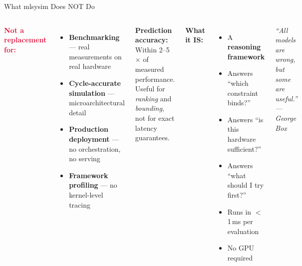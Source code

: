 \begin{frame}{What mlsysim Does NOT Do}
\begin{columns}[T]
\textbf{\textcolor{crimson}{Not a replacement for:}}
\begin{itemize}
  \item \textbf{Benchmarking} --- real measurements on real hardware
  \item \textbf{Cycle-accurate simulation} --- microarchitectural detail
  \item \textbf{Production deployment} --- no orchestration, no serving
  \item \textbf{Framework profiling} --- no kernel-level tracing
\end{itemize}

\vspace{0.5em}
\textbf{Prediction accuracy:}\\
Within \alert{2--5$\times$} of measured performance.\\
Useful for \emph{ranking} and \emph{bounding},\\
not for exact latency guarantees.

\textbf{\textcolor{datastroke}{What it IS:}}
\begin{itemize}
  \item A \textbf{reasoning framework}
  \item Answers ``which constraint binds?''
  \item Answers ``is this hardware sufficient?''
  \item Answers ``what should I try first?''
  \item Runs in $<$1\,ms per evaluation
  \item No GPU required
\end{itemize}

\vspace{0.5em}
\begin{center}
\small\itshape
``All models are wrong,\\
but some are useful.''\\
--- George Box
\end{center}
\end{columns}
\end{frame}

